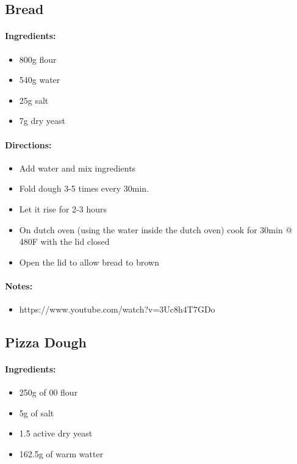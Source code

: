 \documentclass{article}
\begin{document}
\subsection{Bread}

\paragraph{Ingredients:}
\begin{itemize}
    \item 800g flour
    \item 540g water
    \item 25g salt
    \item 7g dry yeast
\end{itemize}

\paragraph{Directions:}
\begin{itemize}
    \item Add water and mix ingredients
    \item Fold dough 3-5 times every 30min.
    \item Let it rise for 2-3 hours
    \item On dutch oven (using the water inside the dutch oven) cook for 30min @ 480F with the lid closed
    \item Open the lid to allow bread to brown
\end{itemize}

\paragraph{Notes:}
\begin{itemize}
    \item https://www.youtube.com/watch?v=3Uc8h4T7GDo
\end{itemize}

\subsection{Pizza Dough}

\paragraph{Ingredients:}
\begin{itemize}
    \item 250g of 00 flour
    \item 5g of salt
    \item 1.5 active dry yeast
    \item 162.5g of warm watter
\end{itemize}
\end{document}
